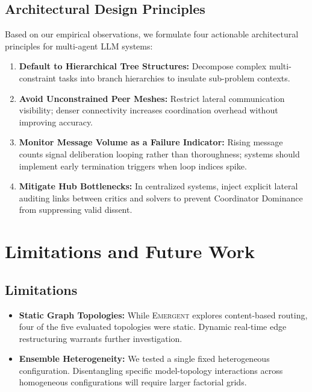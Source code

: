 \documentclass[conference]{IEEEtran}
\newcommand{\topo}[1]{\textsc{#1}}  %
\begin{document}
\subsection{Architectural Design Principles}

Based on our empirical observations, we formulate four actionable architectural principles for multi-agent LLM systems:
\begin{enumerate}
  \item \textbf{Default to Hierarchical Tree Structures:} Decompose complex multi-constraint tasks into branch hierarchies to insulate sub-problem contexts.
  \item \textbf{Avoid Unconstrained Peer Meshes:} Restrict lateral communication visibility; denser connectivity increases coordination overhead without improving accuracy.
  \item \textbf{Monitor Message Volume as a Failure Indicator:} Rising message counts signal deliberation looping rather than thoroughness; systems should implement early termination triggers when loop indices spike.
  \item \textbf{Mitigate Hub Bottlenecks:} In centralized systems, inject explicit lateral auditing links between critics and solvers to prevent Coordinator Dominance from suppressing valid dissent.
\end{enumerate}

\section{Limitations and Future Work}
\label{sec:limitations}

\subsection{Limitations}
\begin{itemize}[leftmargin=1.5em]
  \item \textbf{Static Graph Topologies:} While \topo{Emergent} explores content-based routing, four of the five evaluated topologies were static. Dynamic real-time edge restructuring warrants further investigation.
  \item \textbf{Ensemble Heterogeneity:} We tested a single fixed heterogeneous configuration. Disentangling specific model-topology interactions across homogeneous configurations will require larger factorial grids.
\end{itemize}
\end{document}
